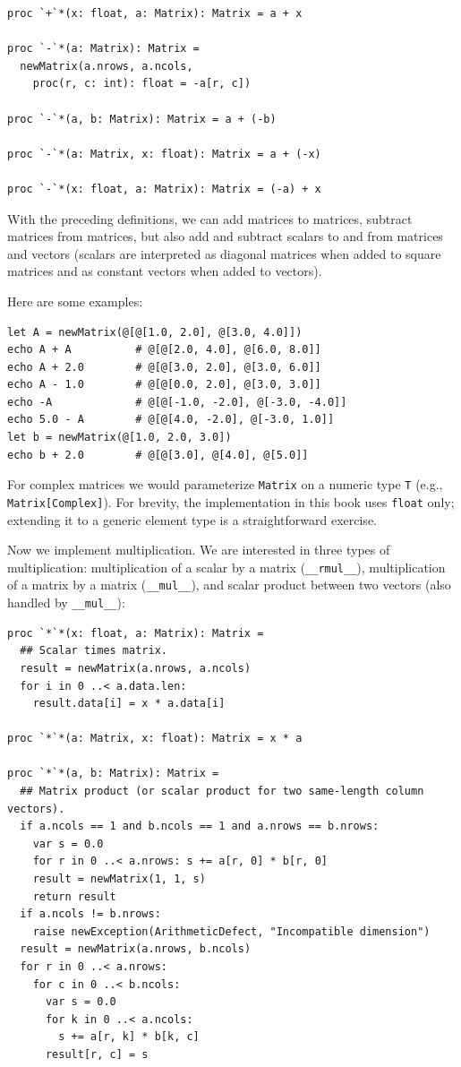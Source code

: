 \documentclass[justified, sixbynine]{tufte-book}
\def\ft{\small\tt}
\theoremstyle{plain}%
\newtheorem * {corollary}{Corollary}
\theoremstyle{definition}
\theoremstyle{remark}
\newtheorem * {remark}{Remark}
\newtheorem * {note}{Note}
\begin{document}
\begin{fullwidth}
\begin{lstlisting}[caption={in file: {\ft nlib.nim}}]
proc `+`*(x: float, a: Matrix): Matrix = a + x

proc `-`*(a: Matrix): Matrix =
  newMatrix(a.nrows, a.ncols,
    proc(r, c: int): float = -a[r, c])

proc `-`*(a, b: Matrix): Matrix = a + (-b)

proc `-`*(a: Matrix, x: float): Matrix = a + (-x)

proc `-`*(x: float, a: Matrix): Matrix = (-a) + x
\end{lstlisting}
With the preceding definitions, we can add matrices to matrices, subtract matrices from matrices, but also add and subtract scalars to and from matrices and vectors
(scalars are interpreted as diagonal matrices when added to square matrices and as constant vectors when added to vectors).

Here are some examples:

\begin{lstlisting}
let A = newMatrix(@[@[1.0, 2.0], @[3.0, 4.0]])
echo A + A          # @[@[2.0, 4.0], @[6.0, 8.0]]
echo A + 2.0        # @[@[3.0, 2.0], @[3.0, 6.0]]
echo A - 1.0        # @[@[0.0, 2.0], @[3.0, 3.0]]
echo -A             # @[@[-1.0, -2.0], @[-3.0, -4.0]]
echo 5.0 - A        # @[@[4.0, -2.0], @[-3.0, 1.0]]
let b = newMatrix(@[1.0, 2.0, 3.0])
echo b + 2.0        # @[@[3.0], @[4.0], @[5.0]]
\end{lstlisting}

For complex matrices we would parameterize {\ft Matrix} on a numeric type {\ft T} (e.g., {\ft Matrix[Complex]}). For brevity, the implementation in this book uses {\ft float} only; extending it to a generic element type is a straightforward exercise.


Now we implement multiplication. We are interested in three types of multiplication: multiplication of a scalar by a matrix ({\ft \_\_rmul\_\_}), multiplication of a matrix by a matrix ({\ft \_\_mul\_\_}), and scalar product between two vectors (also handled by {\ft \_\_mul\_\_}):

\begin{lstlisting}[caption={in file: {\ft nlib.nim}}]
proc `*`*(x: float, a: Matrix): Matrix =
  ## Scalar times matrix.
  result = newMatrix(a.nrows, a.ncols)
  for i in 0 ..< a.data.len:
    result.data[i] = x * a.data[i]

proc `*`*(a: Matrix, x: float): Matrix = x * a

proc `*`*(a, b: Matrix): Matrix =
  ## Matrix product (or scalar product for two same-length column vectors).
  if a.ncols == 1 and b.ncols == 1 and a.nrows == b.nrows:
    var s = 0.0
    for r in 0 ..< a.nrows: s += a[r, 0] * b[r, 0]
    result = newMatrix(1, 1, s)
    return result
  if a.ncols != b.nrows:
    raise newException(ArithmeticDefect, "Incompatible dimension")
  result = newMatrix(a.nrows, b.ncols)
  for r in 0 ..< a.nrows:
    for c in 0 ..< b.ncols:
      var s = 0.0
      for k in 0 ..< a.ncols:
        s += a[r, k] * b[k, c]
      result[r, c] = s
\end{lstlisting}


\end{fullwidth}
\end{document}
